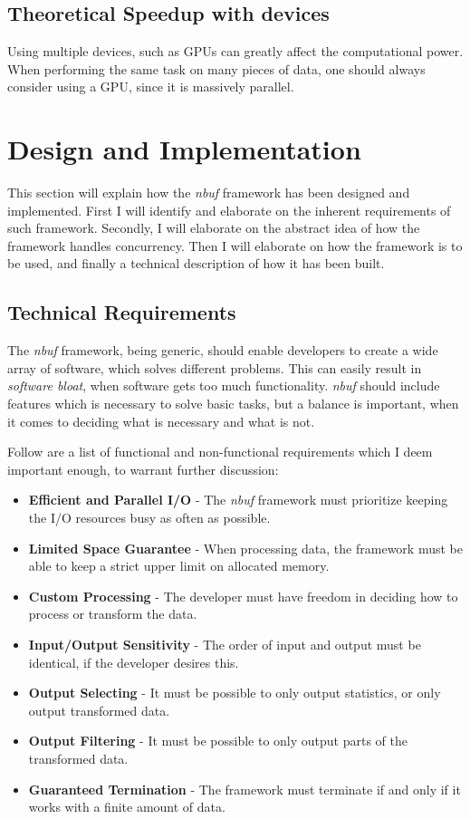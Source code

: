 \documentclass[a4paper]{article}
\newcommand{\nbuf}{\textit{nbuf} }
\begin{document}
\subsection{Theoretical Speedup with devices}
Using multiple devices, such as GPUs can greatly affect the computational power. When performing the same task on many pieces
of data, one should always consider using a GPU, since it is massively parallel.






\newpage
\section{Design and Implementation}
This section will explain how the \nbuf framework has been designed and implemented. First I will identify and elaborate on the inherent requirements of such framework. Secondly, I will elaborate on the abstract idea of how the framework handles concurrency. Then I will elaborate on how the framework is to be used, and finally a technical description of how it has been built.


\subsection{Technical Requirements}
The \nbuf framework, being generic, should enable developers to create a wide array of software, which solves different problems. This can easily result in \textit{software bloat}, when software gets too much functionality. \nbuf should include features which is necessary to solve basic tasks, but a balance is important, when it comes to deciding what is necessary and what is not.

Follow are a list of functional and non-functional requirements which I deem important enough, to warrant further discussion:

\begin{itemize}
\item \textbf{Efficient and Parallel I/O} - The \nbuf framework must prioritize keeping the I/O resources busy as often as possible.
\item \textbf{Limited Space Guarantee} - When processing data, the framework must be able to keep a strict upper limit on allocated memory.
\item \textbf{Custom Processing} - The developer must have freedom in deciding how to process or transform the data.
\item \textbf{Input/Output Sensitivity} - The order of input and output must be identical, if the developer desires this.
\item \textbf{Output Selecting} - It must be possible to only output statistics, or only output transformed data.
\item \textbf{Output Filtering} - It must be possible to only output parts of the transformed data.
\item \textbf{Guaranteed Termination} - The framework must terminate if and only if it works with a finite amount of data.
\end{itemize}
\end{document}
